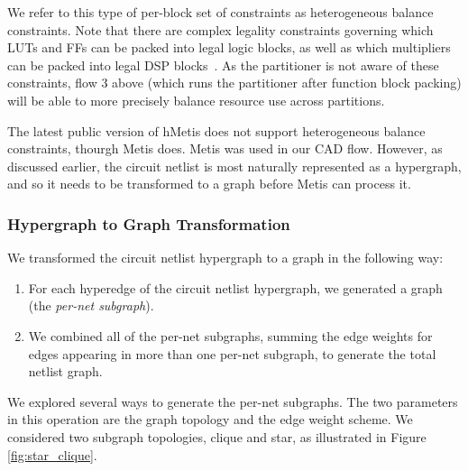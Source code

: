 We refer to this type of per-block set of constraints as heterogeneous balance constraints. Note that there are complex legality constraints governing which LUTs and FFs can be packed into legal logic blocks, as well as which multipliers can be packed into legal DSP blocks~\cite{luu2014vtr}. As the partitioner is not aware of these constraints, flow 3 above (which runs the partitioner after function block packing) will be able to more precisely balance resource use across partitions.

The latest public version of hMetis does not support heterogeneous balance constraints, thourgh Metis does. Metis was used in our CAD flow. However, as discussed earlier, the circuit netlist is most naturally represented as a hypergraph, and so it needs to be transformed to a graph before Metis can process it.

\subsubsection{Hypergraph to Graph Transformation}\label{sec:hypergraph_to_graph}
We transformed the circuit netlist hypergraph to a graph in the following way:
\begin{enumerate}
\item For each hyperedge of the circuit netlist hypergraph, we generated a graph (the \emph{per-net subgraph}).
\item We combined all of the per-net subgraphs, summing the edge weights for edges appearing in more than one per-net subgraph, to generate the total netlist graph.
\end{enumerate}

We explored several ways to generate the per-net subgraphs. The two parameters in this operation are the graph topology and the edge weight scheme. We considered two subgraph topologies, clique and star, as illustrated in Figure \ref{fig:star_clique}.

